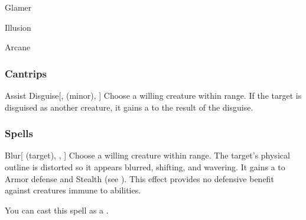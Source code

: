 \newpage
\begin{spellsection}{Glamer}

\begin{spellheader}
\end{spellheader}


 Illusion

 Arcane

\subsubsection{Cantrips}


\begin{apability}{Assist Disguise}[,  (minor), ]
Choose a willing creature within \rngclose range.
If the target is disguised as another creature, it gains a   to the result of the disguise.
\end{apability}

\end{spellsection}


\subsubsection{Spells}


\lowercase{\hypertarget{spell:Blur}{}}\label{spell:Blur}
\begin{attuneability}[\nth{1}]{\hypertarget{spell:Blur}{Blur}}[ (target), , ]
Choose a willing creature within \rngmed range.
The target's physical outline is distorted so it appears blurred, shifting, and wavering.
It gains a   to Armor defense and Stealth (see ).
This effect provides no defensive benefit against creatures immune to  abilities.

You can cast this spell as a .
\end{attuneability}
\vspace{0.25em}



